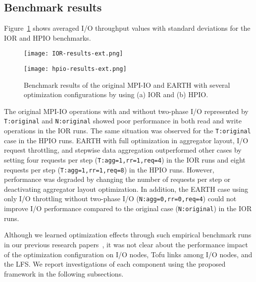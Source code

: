 \documentclass{jhps}
\begin{document}
\subsection{Benchmark results}

Figure~\ref{fig:IOR_HPIO_PERF} shows averaged I/O throughput values
with standard deviations for the IOR and HPIO benchmarks. 
%
\begin{figure}[tb]
\centering
\begin{minipage}[t]{0.46\textwidth}
 \centering
 \texttt{[image: IOR-results-ext.png]}
 \label{fig:IOR_PERF}
\end{minipage}
%
\noindent
\begin{minipage}[t]{0.46\textwidth}
 \texttt{[image: hpio-results-ext.png]}
 \label{fig:HPIO_PERF}
\end{minipage}
\caption{
Benchmark results of the original MPI-IO and EARTH with several optimization
configurations by using (a) IOR and (b) HPIO.}
\label{fig:IOR_HPIO_PERF}
\end{figure}
%

The original MPI-IO operations with and without two-phase I/O represented by
{\tt T:original} and {\tt N:original} showed poor performance in both read and write
operations in the IOR runs.
The same situation was observed for the {\tt T:original} case in the HPIO runs.
EARTH with full optimization in aggregator layout, I/O request throttling,
and stepwise data aggregation outperformed other cases by setting four requests per step
({\tt T:agg=1,rr=1,req=4}) in the IOR runs and eight requests per step
({\tt T:agg=1,rr=1,req=8}) in the HPIO runs.
However, performance was degraded by changing the number of requests per step
or deactivating aggregator layout optimization.
In addition, the EARTH case using only I/O throttling without two-phase I/O
({\tt N:agg=0,rr=0,req=4}) could not improve I/O performance
compared to the original case ({\tt N:original}) in the IOR runs.

Although we learned optimization effects through such empirical benchmark runs
in our previous research papers~\cite{tsujita:WS_EuroMPI2014,tsujita:hpcasia18},
it was not clear about the performance impact of the optimization configuration
on I/O nodes, Tofu links among I/O nodes, and the LFS.
We report investigations of each component using the proposed framework
in the following subsections.

\end{document}
